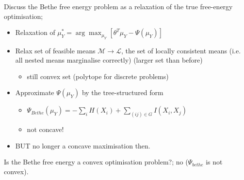 \documentclass{article}
\begin{document}

Discuss the Bethe free energy problem as a relaxation of the true free-energy optimisation; \begin{itemize}
    \item Relaxation of $\mu^*_Y = \arg\max_{\mu_Y}[\theta^T\mu_Y - \Psi(\mu_Y)]$
    \item Relax set of feasible means $\mathcal{M}\rightarrow \mathcal{L}$, the set of locally consistent means (i.e. all nested means marginalise correctly) (larger set than before)
    \begin{itemize}
        \item still convex set (polytope for discrete problems)
    \end{itemize}
    \item Approximate $\Psi(\mu_Y)$ by the tree-structured form \begin{itemize}
        \item $\Psi_{Bethe}(\mu_Y) = -\sum_iH(X_i) + \sum_{(ij)\in G}I(X_i, X_j)$
        \item not concave!
    \end{itemize}
    \item BUT no longer a concave maximisation then.
\end{itemize}

Is the Bethe free energy a convex optimisation problem?; no ($\Psi_{bethe}$ is not convex).

\end{document}
